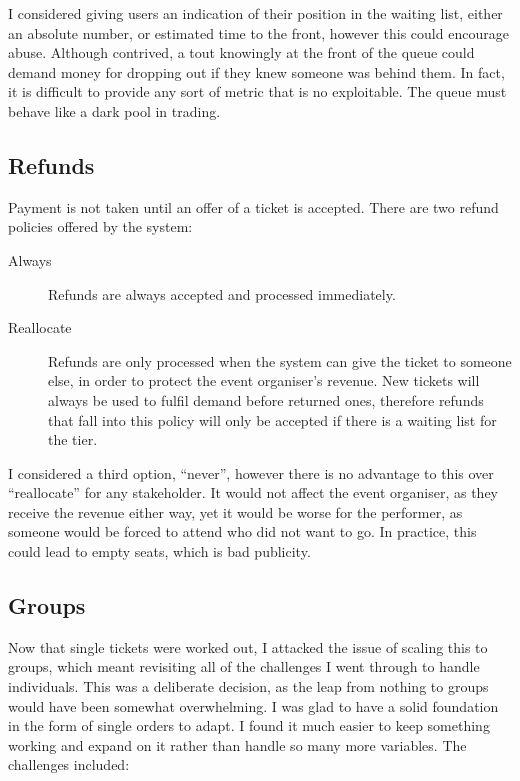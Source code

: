 \documentclass[12pt,a4paper]{bhamdissertation}
\begin{document}
I considered giving users an indication of their position in the waiting list, either an absolute number, or estimated time to the front, however this could encourage abuse. Although contrived, a tout knowingly at the front of the queue could demand money for dropping out if they knew someone was behind them. In fact, it is difficult to provide any sort of metric that is no exploitable. The queue must behave like a dark pool in trading.

\subsection{Refunds}

Payment is not taken until an offer of a ticket is accepted. There are two refund policies offered by the system:

\begin{description}
    \item[Always] Refunds are always accepted and processed immediately.
    \item[Reallocate] Refunds are only processed when the system can give the ticket to someone else, in order to protect the event organiser's revenue. New tickets will always be used to fulfil demand before returned ones, therefore refunds that fall into this policy will only be accepted if there is a waiting list for the tier.
\end{description}

I considered a third option, ``never'', however there is no advantage to this over ``reallocate'' for any stakeholder. It would not affect the event organiser, as they receive the revenue either way, yet it would be worse for the performer, as someone would be forced to attend who did not want to go. In practice, this could lead to empty seats, which is bad publicity.

\subsection{Groups}

Now that single tickets were worked out, I attacked the issue of scaling this to groups, which meant revisiting all of the challenges I went through to handle individuals. This was a deliberate decision, as the leap from nothing to groups would have been somewhat overwhelming. I was glad to have a solid foundation in the form of single orders to adapt. I found it much easier to keep something working and expand on it rather than handle so many more variables. The challenges included:
\end{document}
